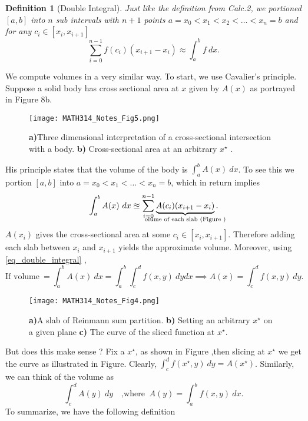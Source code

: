 \documentclass[
	12pt,
	]{article}
\theoremstyle{custom}
\theoremstyle{custom}
\theoremstyle{custom}
\theoremstyle{custom}
\newtheorem{definition}{Definition}[section]
\theoremstyle{custom}
\theoremstyle{definition}
\theoremstyle{example}
\theoremstyle{note}
\theoremstyle{remark}
\theoremstyle{example}
\newcounter{theo}[section]\setcounter{theo}{0}
\numberwithin{equation}{subsection}
\begin{document}
	   		 \begin{definition}[Double Integral]
	   		 	Just like the definition from Calc.2, we portioned $[a,b]$ into $n$ sub intervals with $n+1$ points $a=x_{0} < x_{1} < x_{2} < \dots <x_{n} =b$ and for any $c_{i} \in [x_{i} , x_{i+1}]$
	   		 	$$ \sum_{i=0}^{n-1} f(c_{i})(x_{i+1}-x_{i}) \approx \int_{a}^{b} f \ dx.$$
	   		 \end{definition}
	   		 
	   		 \noindent We compute volumes in a very similar way. To start, we use Cavalier's principle. Suppose a solid body has cross sectional area at $x$ given by $A(x)$ as portrayed in Figure 8b.
	   		 \begin{figure}[H]
	   		 	   		 	\centering
	   		 	   		 	\texttt{[image: MATH314\_Notes\_Fig5.png]}
	   		 	   		 	\captionsetup{margin=1cm, justification=raggedright}\caption{\textbf{a)}Three dimensional interpretation of a cross-sectional intersection with a body. \textbf{b)} Cross-sectional area at an arbitrary $x^{\star}$ .}
	   		 	   		 \end{figure}
	   		 His principle states that the volume of the body is $\int_{a}^{b} A(x) \  dx$. To see this we portion $[a,b]$ into $a=x_{0} < x_{1} < \dots < x_{n} =b$, which in return implies 
	   		 $$ \int_{a}^{b} A(x) \  dx \approxeq \sum_{i=0}^{n-1}\underbrace{A(c_{i})(x_{i+1}- x_{i})}_{\mathclap{\text{olume of each slab (Figure )}}}.$$
	   		 $A(x_{i})$ gives the cross-sectional area at some $c_{i} \in [x_{i} , x_{i+1}]$. Therefore adding each slab between $x_{i}$ and $x_{i+1}$ yields the approximate volume. Moreover, using \eqref{eq_double_integral} ,
	   		 $$ \text{If volume} \ = \int_{a}^{b}A(x) \ dx = \int_{a}^{b}\int_{c}^{d} f(x,y) \ dydx \implies A(x) =\int_{c}^{d} f(x,y) \ dy. $$
	   		 \begin{figure}[H]
	   		 	\centering
	   		 	\texttt{[image: MATH314\_Notes\_Fig4.png]}
	   		 	\captionsetup{margin=1cm, justification=raggedright}\caption{\textbf{a)}A slab of Reinmann sum partition. \textbf{b)} Setting an arbitrary $x^{\star}$ on a given plane \textbf{c)} The curve of the sliced function at $x^{\star}$.}
	   		 \end{figure}
	   		 But does this make sense ? Fix a $x^{\star}$, as shown in Figure ,then slicing at $x^{\star}$ we get the curve as illustrated in Figure. Clearly, $\int_{c}^{d}f(x^{\star},y) \ dy = A(x^{\star})$. Similarly, we can think of the volume as 
	   		 $$ \int_{c}^{d} A(y) \ dy  \quad \text{,where } \ A(y) = \int_{a}^{b}f(x,y) \ dx.$$
 	   		 To summarize, we have the following definition
 	   		 
\end{document}
